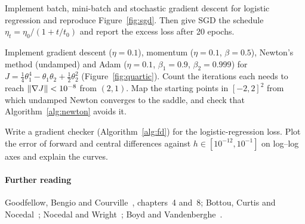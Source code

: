 \documentclass[11pt]{article}
\begin{document}
\begin{questions}
\begin{programming}
\item Implement batch, mini-batch and stochastic gradient descent for logistic regression and reproduce
Figure~\ref{fig:sgd}. Then give SGD the schedule $\eta_t = \eta_0/(1 + t/t_0)$ and report the excess loss after 20 epochs.
\item Implement gradient descent ($\eta = 0.1$), momentum ($\eta = 0.1$, $\beta = 0.5$), Newton's method (undamped) and
Adam ($\eta = 0.1$, $\beta_1 = 0.9$, $\beta_2 = 0.999$) for $J = \frac14\theta_1^4 - \theta_1\theta_2 + \frac12\theta_2^2$
(Figure~\ref{fig:quartic}). Count the iterations each needs to reach $\left\lVert \nabla J \right\rVert < 10^{-8}$ from $(2, 1)$. Map the
starting points in $[-2, 2]^2$ from which undamped Newton converges to the saddle, and check that
Algorithm~\ref{alg:newton} avoids it.
\item Write a gradient checker (Algorithm~\ref{alg:fd}) for the logistic-regression loss. Plot the error of forward
and central differences against $h \in [10^{-12}, 10^{-1}]$ on log--log axes and explain the curves.
\end{programming}
\end{questions}

\paragraph{Further reading} Goodfellow, Bengio and Courville~\cite{goodfellow2016}, chapters~4 and~8; Bottou, Curtis
and Nocedal~\cite{bottou2018}; Nocedal and Wright~\cite{nocedal2006}; Boyd and Vandenberghe~\cite{boyd2004}.
\end{document}
